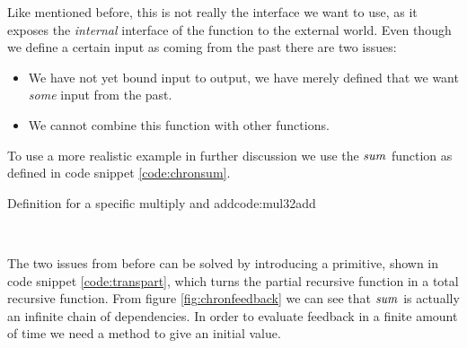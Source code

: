Like mentioned before, this is not really the interface we want to use, as it exposes the \textit{internal} interface of the function to the external world.
Even though we define a certain input as coming from the past there are two issues:
\begin{itemize}
 \item We have not yet bound input to output, we have merely defined that we want \textit{some} input from the past.
 \item We cannot combine this function with other functions.
\end{itemize}

To use a more realistic example in further discussion we use the \ensuremath{\Varid{sum}} function as defined in code snippet \ref{code:chronsum}.
\begin{texexptitled}{Definition for a specific multiply and add}{code:mul32add}
\begin{hscode}\SaveRestoreHook
{}%
%
\>[B]{}\mathbin{::}\langle{}\rangle\to {}\langle{}\mathbin{-}\rangle\to {}\langle{}\rangle{}\<[E]%
\\
\>[B]{}\;\;\mathrel{=}\mathbin{+}\<[E]%
\ColumnHook
\end{hscode}\resethooks
\end{texexptitled}

The two issues from before can be solved by introducing a primitive, shown in code snippet \ref{code:transpart}, which turns the partial recursive function in a total recursive function.
From figure \ref{fig:chronfeedback} we can see that \ensuremath{\Varid{sum}} is actually an infinite chain of dependencies.
In order to evaluate feedback in a finite amount of time we need a method to give an initial value.

